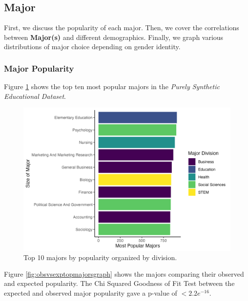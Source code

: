 \documentclass{article}
\begin{document}
\subsection{Major}\label{major-1}

\label{sec:major_res}

First, we discuss the popularity of each major. Then, we cover the correlations between \textbf{Major(s)} and different demographics. Finally, we graph various distributions of major choice depending on gender identity.

\subsubsection{Major Popularity}\label{major-popularity}

Figure \ref{fig:topmajorgraph} shows the top ten most popular majors in the \emph{Purely Synthetic Educational Dataset}.



\begin{figure}

{\centering \includegraphics[width=0.9\linewidth]{top_major_graph} 

}

\caption{Top 10 majors by popularity organized by division.}\label{fig:topmajorgraph}
\end{figure}

Figure \ref{fig:obsvsexptopmajorsgraph} shows the majors comparing their observed and expected popularity. The Chi Squared Goodness of Fit Test between the expected and observed major popularity gave a p-value of \(<2.2e^{-16}\).
\end{document}
